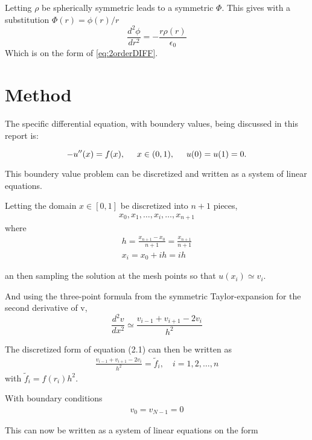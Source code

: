 \documentclass[11pt,a4paper,english,final]{article}
\numberwithin{equation}{section}
\newcommand{\spac}{\hspace{5mm}}
\begin{document}
Letting $\rho$ be spherically symmetric leads to a symmetric $\Phi$.
This gives with a substitution $\Phi(r) = \phi(r)/r$
\begin{equation}
\frac{d^2\phi}{dr^2} = -\frac{r\rho(r)}{\epsilon_0}
\end{equation}
Which is on the form of \eqref{eq:2orderDIFF}.

\section{Method}

The specific differential equation, with boundery values, being discussed in this report is: 

\begin{equation}
-u''(x) = f(x), \spac x \in (0,1), \spac u(0) = u(1) = 0.
\end{equation}

This boundery value problem can be discretized and written as a system of linear equations.

Letting the domain $x \in [0,1]$ be discretized into $n+1$ pieces,
\begin{gather}
x_0, x_1, \dots, x_i, \dots, x_{n+1}
\end{gather}
where 
\begin{gather}
h = \frac{x_{n+1} - x_0}{n+1} = \frac{x_{n+1}}{n+1}\\
x_i = x_0 + ih = ih
\end{gather}

an then sampling the solution at the mesh points so that $u(x_i) \simeq v_i$.

And using the three-point formula from the symmetric 
Taylor-expansion for the second derivative of v,
\begin{equation}
\frac{d^2v}{dx^2} \simeq \frac{v_{i-1} + v_{i+1} - 2v_i}{h^2}
\end{equation}

The discretized form of equation (2.1) can then be written as
\begin{gather}
\frac{v_{i-1} + v_{i+1} - 2v_i}{h^2} = \tilde{f}_i , \quad i=1,2, \dots, n 
\end{gather}
with $\tilde{f}_i = f(r_i) h^2$.

With boundary conditions 
\begin{gather}
v_0 = v_{N-1} = 0
\end{gather}

This can now be written as a system of linear equations on the form 
\end{document}
